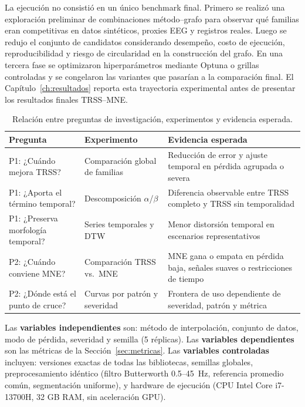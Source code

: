 La ejecución no consistió en un único benchmark final. Primero se realizó una exploración preliminar de combinaciones método--grafo para observar qué familias eran competitivas en datos sintéticos, proxies EEG y registros reales. Luego se redujo el conjunto de candidatos considerando desempeño, costo de ejecución, reproducibilidad y riesgo de circularidad en la construcción del grafo. En una tercera fase se optimizaron hiperparámetros mediante Optuna o grillas controladas y se congelaron las variantes que pasarían a la comparación final. El Capítulo~\ref{ch:resultados} reporta esta trayectoria experimental antes de presentar los resultados finales TRSS--MNE.
\begin{table}[htbp]
\centering
\caption{Relación entre preguntas de investigación, experimentos y evidencia esperada.}
\label{tab:research_questions_experiments}
\small
\begin{tabular}{@{}p{3.2cm} p{3.0cm} p{5.5cm}@{}}
\toprule
Pregunta & Experimento & Evidencia esperada \\
\midrule
P1: ¿Cuándo mejora TRSS? & Comparación global de familias & Reducción de error y ajuste temporal en pérdida agrupada o severa \\
P1: ¿Aporta el término temporal? & Descomposición $\alpha$/$\beta$ & Diferencia observable entre TRSS completo y TRSS sin temporalidad \\
P1: ¿Preserva morfología temporal? & Series temporales y DTW & Menor distorsión temporal en escenarios representativos \\
P2: ¿Cuándo conviene MNE? & Comparación TRSS vs.\ MNE & MNE gana o empata en pérdida baja, señales suaves o restricciones de tiempo \\
P2: ¿Dónde está el punto de cruce? & Curvas por patrón y severidad & Frontera de uso dependiente de severidad, patrón y métrica \\
\bottomrule
\end{tabular}
\end{table}

Las \textbf{variables independientes} son: método de interpolación, conjunto de datos, modo de pérdida, severidad y semilla (5 réplicas). Las \textbf{variables dependientes} son las métricas de la Sección~\ref{sec:metricas}. Las \textbf{variables controladas} incluyen: versiones exactas de todas las bibliotecas, semillas globales, preprocesamiento idéntico (filtro Butterworth 0.5--45~Hz, referencia promedio común, segmentación uniforme), y hardware de ejecución (CPU Intel Core i7-13700H, 32 GB RAM, sin aceleración GPU).

